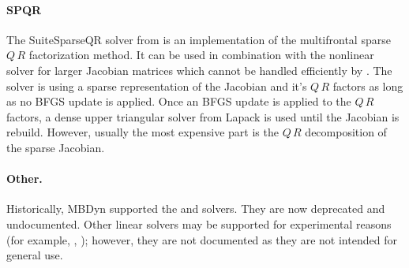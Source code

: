 \paragraph{SPQR}
The SuiteSparseQR solver  from \cite{SUITESPARSE-QR-2011} is an implementation
of the multifrontal sparse $Q\,R$ factorization method. It can be used in combination
with the  nonlinear solver for larger Jacobian matrices which cannot be
handled efficiently by . The  solver is using a sparse representation
of the Jacobian and it's $Q\,R$ factors as long as no BFGS update is applied.
Once an BFGS update is applied to the $Q\,R$ factors, a dense upper triangular solver
from Lapack is used until the Jacobian is rebuild. However, usually the most expensive
part is the $Q\,R$ decomposition of the sparse Jacobian.

\begin{comment}
Another linear solver, that is available mostly for historical reasons, 
is \kw{harwell}, with a \nt{workspace\_size}
of $ \nt{numdofs}\times\nt{numdofs} $, but in certain cases the user
might prefer a smaller workspace, since the matrix is handled as sparse,
while sometimes a larger space is required, since when the matrix is
full, a little more space is required, due to extra storage needs when
the matrix fills up.
\end{comment}

\paragraph{Other.}
Historically, MBDyn supported the  and  solvers.
They are now deprecated and undocumented.
Other linear solvers may be supported for experimental reasons
(for example, , );
however, they are not documented as they are not intended for general use.

